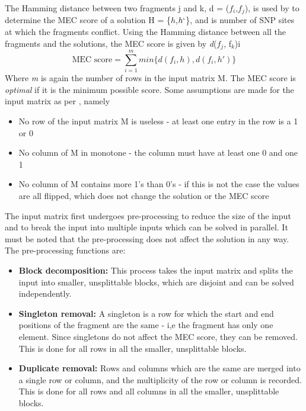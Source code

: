 \documentclass[10pt,a4paer,twocolumn]{article}
\newcommand{\M}{\textit{m }}
\newcommand{\D}{\textit{d}}
\begin{document}
The Hamming distance between two fragments j and k, d = ($f_i$,$f_j$), is used by \cite{chen:2013} to 
determine the MEC score of a solution H = \{$h$,$h`$\}, and is number of SNP sites at which the fragments 
conflict. Using the Hamming distance between all the fragments and the solutions, the MEC score is given by
\D($f_j$, f$_k$)i
\begin{equation}
\textrm{MEC score} = \sum_{i = 1}^{m}{ min\{\D(f_i, h), \D(f_i, h')\} }
\end{equation}
Where \M is again the number of rows in the input matrix M. The MEC score is \textit{optimal} if it is the
minimum possible score. Some assumptions are made for the input matrix as per \cite{chen:2013}, namely
\begin{itemize}
\item{ No row of the input matrix M is useless - at least one entry in the row is a 1 or 0 
}
\item{ No column of M in monotone - the column must have at least one 0 and one 1
}
\item{ No column of M contains more 1's than 0's - if this is not the case the values are all flipped, which
    does not change the solution or the MEC score
}
\end{itemize}
The input matrix first undergoes pre-processing to reduce the size of the input and to break the input into
multiple inputs which can be solved in parallel. It must be noted that the pre-processing does not affect 
the solution in any way. The pre-processing functions are:
\begin{itemize}
\item{ \textbf{Block decomposition:} This process takes the input matrix and splits the input into smaller,
        unsplittable blocks, which are disjoint and can be solved independently.
}
\item{ \textbf{Singleton removal:} A singleton is a row for which the start and end positions of the fragment
    are the same - i,e the fragment has only one element. Since singletons do not affect the MEC score,
    they can be removed. This is done for all rows in all the smaller, unsplittable blocks.
}
\item{ \textbf{Duplicate removal:} Rows and columns which are the same are merged into a single row or column, 
        and the multiplicity of the row or column is recorded. This is done for all rows and all columns in
        all the smaller, unsplittable blocks.
}
\end{itemize}
\end{document}
